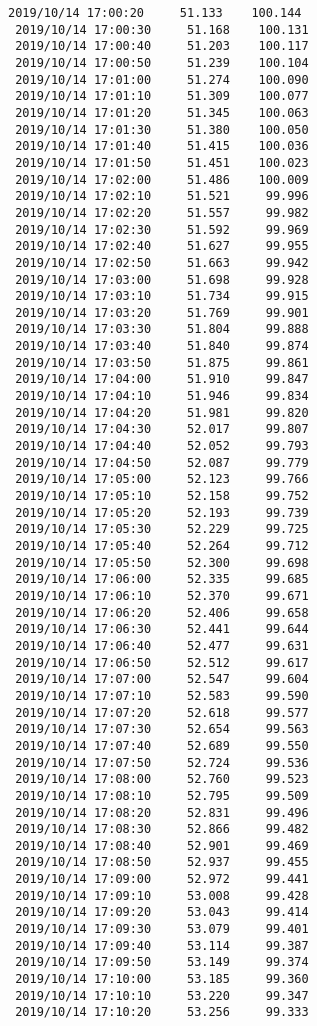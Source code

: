 \documentclass[11pt]{article}
\begin{document}
\begin{Verbatim}[commandchars=\\\{\}]
 2019/10/14 17:00:20     51.133    100.144
 2019/10/14 17:00:30     51.168    100.131
 2019/10/14 17:00:40     51.203    100.117
 2019/10/14 17:00:50     51.239    100.104
 2019/10/14 17:01:00     51.274    100.090
 2019/10/14 17:01:10     51.309    100.077
 2019/10/14 17:01:20     51.345    100.063
 2019/10/14 17:01:30     51.380    100.050
 2019/10/14 17:01:40     51.415    100.036
 2019/10/14 17:01:50     51.451    100.023
 2019/10/14 17:02:00     51.486    100.009
 2019/10/14 17:02:10     51.521     99.996
 2019/10/14 17:02:20     51.557     99.982
 2019/10/14 17:02:30     51.592     99.969
 2019/10/14 17:02:40     51.627     99.955
 2019/10/14 17:02:50     51.663     99.942
 2019/10/14 17:03:00     51.698     99.928
 2019/10/14 17:03:10     51.734     99.915
 2019/10/14 17:03:20     51.769     99.901
 2019/10/14 17:03:30     51.804     99.888
 2019/10/14 17:03:40     51.840     99.874
 2019/10/14 17:03:50     51.875     99.861
 2019/10/14 17:04:00     51.910     99.847
 2019/10/14 17:04:10     51.946     99.834
 2019/10/14 17:04:20     51.981     99.820
 2019/10/14 17:04:30     52.017     99.807
 2019/10/14 17:04:40     52.052     99.793
 2019/10/14 17:04:50     52.087     99.779
 2019/10/14 17:05:00     52.123     99.766
 2019/10/14 17:05:10     52.158     99.752
 2019/10/14 17:05:20     52.193     99.739
 2019/10/14 17:05:30     52.229     99.725
 2019/10/14 17:05:40     52.264     99.712
 2019/10/14 17:05:50     52.300     99.698
 2019/10/14 17:06:00     52.335     99.685
 2019/10/14 17:06:10     52.370     99.671
 2019/10/14 17:06:20     52.406     99.658
 2019/10/14 17:06:30     52.441     99.644
 2019/10/14 17:06:40     52.477     99.631
 2019/10/14 17:06:50     52.512     99.617
 2019/10/14 17:07:00     52.547     99.604
 2019/10/14 17:07:10     52.583     99.590
 2019/10/14 17:07:20     52.618     99.577
 2019/10/14 17:07:30     52.654     99.563
 2019/10/14 17:07:40     52.689     99.550
 2019/10/14 17:07:50     52.724     99.536
 2019/10/14 17:08:00     52.760     99.523
 2019/10/14 17:08:10     52.795     99.509
 2019/10/14 17:08:20     52.831     99.496
 2019/10/14 17:08:30     52.866     99.482
 2019/10/14 17:08:40     52.901     99.469
 2019/10/14 17:08:50     52.937     99.455
 2019/10/14 17:09:00     52.972     99.441
 2019/10/14 17:09:10     53.008     99.428
 2019/10/14 17:09:20     53.043     99.414
 2019/10/14 17:09:30     53.079     99.401
 2019/10/14 17:09:40     53.114     99.387
 2019/10/14 17:09:50     53.149     99.374
 2019/10/14 17:10:00     53.185     99.360
 2019/10/14 17:10:10     53.220     99.347
 2019/10/14 17:10:20     53.256     99.333

\end{Verbatim}
\end{document}
